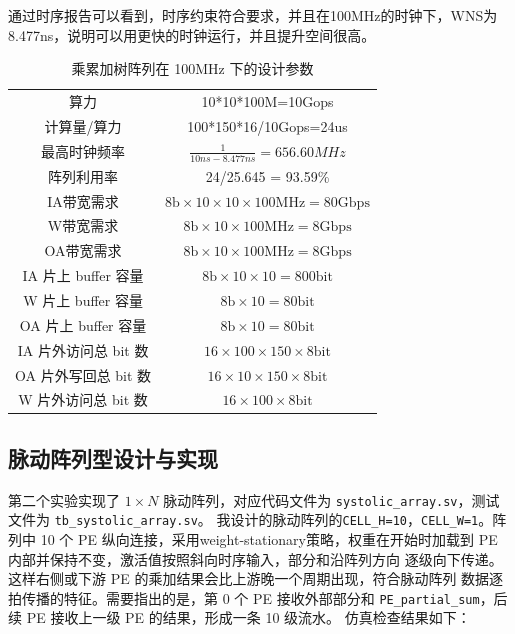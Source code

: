 \documentclass[UTF8]{ctexart}
\begin{document}
通过时序报告可以看到，时序约束符合要求，并且在100MHz的时钟下，WNS为8.477ns，说明可以用更快的时钟运行，并且提升空间很高。
\begin{table}[H]
    \centering
    \caption{乘累加树阵列在 100MHz 下的设计参数}
    \begin{tabular}{cc}
        \toprule
        算力 & 10*10*100M=10Gops \\
        计算量/算力 & 100*150*16/10Gops=24us \\
        \midrule
        最高时钟频率 & $\frac{1}{10ns-8.477ns}=656.60MHz$ \\
        \midrule
        阵列利用率 & 24/25.645 = 93.59\% \\        
        \midrule
        IA带宽需求 & $8\mathrm{b}\times10\times10\times100\mathrm{MHz}=80\mathrm{Gbps}$ \\
        W带宽需求 & $8\mathrm{b}\times10\times100\mathrm{MHz}=8\mathrm{Gbps}$ \\
        OA带宽需求 & $8\mathrm{b}\times10\times100\mathrm{MHz}=8\mathrm{Gbps}$ \\
        \midrule
        IA 片上 buffer 容量 & $8\mathrm{b}\times10\times10=800\mathrm{bit}$ \\
        W 片上 buffer 容量 & $8\mathrm{b}\times10=80\mathrm{bit}$ \\
        OA 片上 buffer 容量 & $8\mathrm{b}\times10=80\mathrm{bit}$ \\
        \midrule
        IA 片外访问总 bit 数 & $16\times100\times150\times8\mathrm{bit}$ \\
        OA 片外写回总 bit 数 & $16\times10\times150\times8\mathrm{bit}$ \\
        W 片外访问总 bit 数 & $16\times100\times8\mathrm{bit}$ \\
        \bottomrule
    \end{tabular}
\end{table}

\subsection{脉动阵列型设计与实现}

第二个实验实现了 $1\times N$ 脉动阵列，对应代码文件为
\verb|systolic_array.sv|，测试文件为 \verb|tb_systolic_array.sv|。
我设计的脉动阵列的\verb|CELL_H=10|，\verb|CELL_W=1|。阵列中 10 个 PE 纵向连接，采用weight-stationary策略，权重在开始时加载到 PE 内部并保持不变，激活值按照斜向时序输入，部分和沿阵列方向
逐级向下传递。这样右侧或下游 PE 的乘加结果会比上游晚一个周期出现，符合脉动阵列
数据逐拍传播的特征。需要指出的是，第 0 个 PE 接收外部部分和
    \verb|PE_partial_sum|，后续 PE 接收上一级 PE 的结果，形成一条 10 级流水。
仿真检查结果如下：
\end{document}
